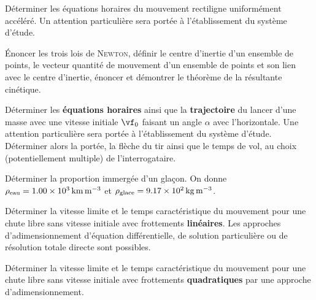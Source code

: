 \documentclass[a4paper, 12pt, final, garamond]{book}
\begin{document}
\begin{enumerate}[resume]
	\litem{\str}%
	Déterminer les équations horaires du mouvement rectiligne uniformément
	accéléré. Un attention particulière sera portée à l'établissement du
	système d'étude.
\end{enumerate}
\begin{enumerate}[resume]
	\litem{\strr}%
	Énoncer les trois lois de \textsc{Newton}, définir le centre d'inertie
	d'un ensemble de points, le vecteur quantité de mouvement d'un
	ensemble de points et son lien avec le centre d'inertie, énoncer et
	démontrer le théorème de la résultante cinétique.

	\litem{\strrr}%
	Déterminer les \textbf{équations horaires} ainsi que la
	\textbf{trajectoire} du lancer d'une masse avec une vitesse initiale
	$\vf_0$ faisant un angle $\alpha$ avec l'horizontale. Une attention
	particulière sera portée à l'établissement du système d'étude.
	Déterminer alors la portée, la flèche du tir ainsi que le temps de vol,
	au choix (potentiellement multiple) de l'interrogataire.

	\litem{\str}%
	Déterminer la proportion immergée d'un glaçon. On donne $\rho_{\rm
			eau} = \SI{1.00e3}{km.m^{-3}}$ et $\rho_{\rm glace} =
		\SI{9.17e2}{kg.m^{-3}}$.

	\litem{\strr}%
	Déterminer la vitesse limite et le temps caractéristique du
	mouvement pour une chute libre sans vitesse initiale avec frottements
	\textbf{linéaires}. Les approches d'adimensionnement d'équation différentielle,
	de solution particulière ou de résolution totale directe sont possibles.

	\litem{\strr}%
	Déterminer la vitesse limite et le temps caractéristique du
	mouvement pour une chute libre sans vitesse initiale avec frottements
	\textbf{quadratiques} par une approche d'adimensionnement.
\end{enumerate}
\end{document}
